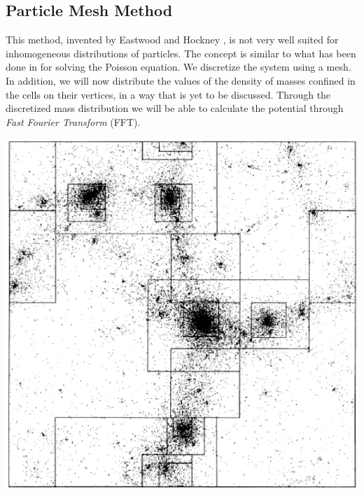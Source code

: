 \subsection{Particle Mesh Method}

\vspace{0.1cm}
\noindent
\begin{minipage}{\textwidth}
\begin{minipage}{.58\textwidth}
This method, invented by Eastwood and Hockney \citep{hockney,hockney_book}, is not very well suited for inhomogeneous distributions of particles. The concept is similar to what has been done in \citet{comp_phys} for solving the Poisson equation. We discretize the system using a mesh. In addition, we will now distribute the values of the density of masses confined in the cells on their vertices, in a way that is yet to be discussed. Through the discretized mass distribution we will be able to calculate the potential through \emph{Fast Fourier Transform} (FFT).
 \end{minipage}\hfill
\begin{minipage}{.38\textwidth}
  \centering
  \includegraphics[width=\textwidth]{pics/particle_mesh}
  \label{fig:particle_mesh}
\end{minipage}
\end{minipage}
\vspace{0.011cm}

